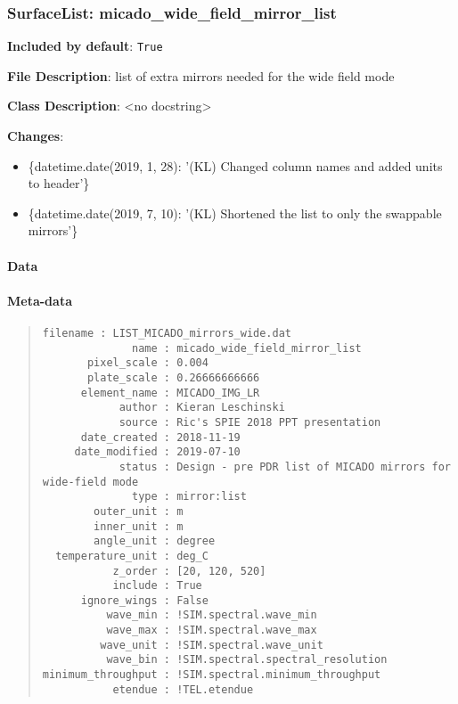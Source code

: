 \subsubsection{SurfaceList: \textquotedbl{}micado\_wide\_field\_mirror\_list\textquotedbl{}%
  \label{surfacelist-micado-wide-field-mirror-list}%
}

\textbf{Included by default}: \texttt{True}

\textbf{File Description}: list of extra mirrors needed for the wide field mode

\textbf{Class Description}: <no docstring>

\textbf{Changes}:

\begin{itemize}
\item \{datetime.date(2019, 1, 28): '(KL) Changed column names and added units to header'\}

\item \{datetime.date(2019, 7, 10): '(KL) Shortened the list to only the swappable mirrors'\}
\end{itemize}


\paragraph{Data%
  \label{data}%
}


\paragraph{Meta-data%
  \label{meta-data}%
}

\begin{quote}
\begin{alltt}
\begin{lstlisting}[frame=single]
          filename : LIST_MICADO_mirrors_wide.dat
              name : micado_wide_field_mirror_list
       pixel_scale : 0.004
       plate_scale : 0.26666666666
      element_name : MICADO_IMG_LR
            author : Kieran Leschinski
            source : Ric's SPIE 2018 PPT presentation
      date_created : 2018-11-19
     date_modified : 2019-07-10
            status : Design - pre PDR list of MICADO mirrors for wide-field mode
              type : mirror:list
        outer_unit : m
        inner_unit : m
        angle_unit : degree
  temperature_unit : deg_C
           z_order : [20, 120, 520]
           include : True
      ignore_wings : False
          wave_min : !SIM.spectral.wave_min
          wave_max : !SIM.spectral.wave_max
         wave_unit : !SIM.spectral.wave_unit
          wave_bin : !SIM.spectral.spectral_resolution
minimum_throughput : !SIM.spectral.minimum_throughput
           etendue : !TEL.etendue
\end{lstlisting}
\end{alltt}
\end{quote}


